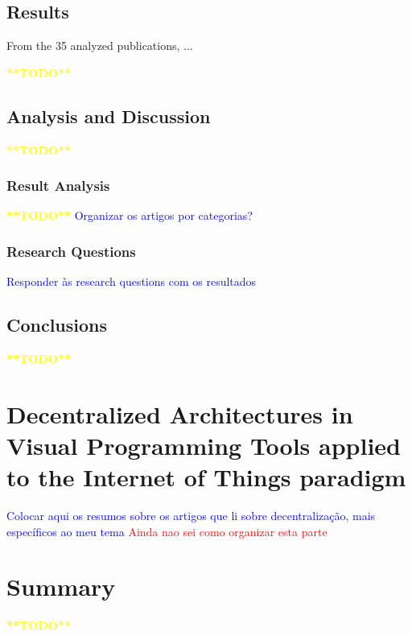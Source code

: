 \subsection{Results}\label{sec:slr_results}

From the 35 analyzed publications, ...

\textcolor{yellow}{\textbf{**TODO**}}

\subsection{Analysis and Discussion}

\textcolor{yellow}{\textbf{**TODO**}}

\subsubsection{Result Analysis}

\textcolor{yellow}{\textbf{**TODO**}}
\textcolor{blue}{Organizar os artigos por categorias?}

\subsubsection{Research Questions}

\textcolor{blue}{Responder às research questions com os resultados}

\subsection{Conclusions}

\textcolor{yellow}{\textbf{**TODO**}}

\section{Decentralized Architectures in Visual Programming Tools applied to the Internet of Things paradigm}

\textcolor{blue}{Colocar aqui os resumos sobre os artigos que li sobre decentralização, mais específicos ao meu tema}
\textcolor{red}{Ainda nao sei como organizar esta parte}

\section{Summary}

\textcolor{yellow}{\textbf{**TODO**}}

